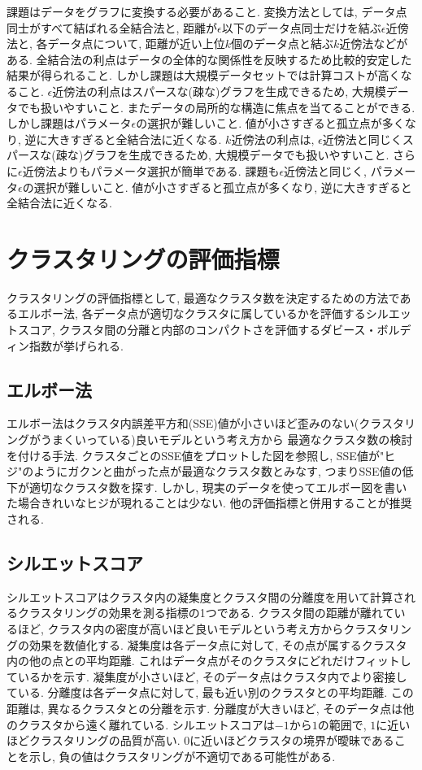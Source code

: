 \documentclass[dvipdfmx, 10pt]{jsarticle}
\begin{document}
課題はデータをグラフに変換する必要があること. 
変換方法としては, データ点同士がすべて結ばれる全結合法と, 距離が\(\epsilon\)以下のデータ点同士だけを結ぶ\(\epsilon\)近傍法と, 
各データ点について, 距離が近い上位\(k\)個のデータ点と結ぶ\(k\)近傍法などがある. 
全結合法の利点はデータの全体的な関係性を反映するため比較的安定した結果が得られること. 
しかし課題は大規模データセットでは計算コストが高くなること. 
\(\epsilon\)近傍法の利点はスパースな(疎な)グラフを生成できるため, 大規模データでも扱いやすいこと. 
またデータの局所的な構造に焦点を当てることができる. 
しかし課題はパラメータ\(\epsilon\)の選択が難しいこと. 値が小さすぎると孤立点が多くなり, 逆に大きすぎると全結合法に近くなる. 
\(k\)近傍法の利点は, \(\epsilon\)近傍法と同じくスパースな(疎な)グラフを生成できるため, 大規模データでも扱いやすいこと. 
さらに\(\epsilon\)近傍法よりもパラメータ選択が簡単である. 課題も\(\epsilon\)近傍法と同じく, 
パラメータ\(\epsilon\)の選択が難しいこと. 値が小さすぎると孤立点が多くなり, 逆に大きすぎると全結合法に近くなる. 

\section*{クラスタリングの評価指標}
クラスタリングの評価指標として, 最適なクラスタ数を決定するための方法であるエルボー法, 
各データ点が適切なクラスタに属しているかを評価するシルエットスコア, 
クラスタ間の分離と内部のコンパクトさを評価するダビース・ボルディン指数が挙げられる. 

\subsection*{エルボー法}
エルボー法はクラスタ内誤差平方和(SSE)値が小さいほど歪みのない(クラスタリングがうまくいっている)良いモデルという考え方から
最適なクラスタ数の検討を付ける手法. クラスタごとのSSE値をプロットした図を参照し, 
SSE値が"ヒジ"のようにガクンと曲がった点が最適なクラスタ数とみなす, つまりSSE値の低下が適切なクラスタ数を探す. 
しかし, 現実のデータを使ってエルボー図を書いた場合きれいなヒジが現れることは少ない. 他の評価指標と併用することが推奨される.

\subsection*{シルエットスコア}
シルエットスコアはクラスタ内の凝集度とクラスタ間の分離度を用いて計算されるクラスタリングの効果を測る指標の1つである. 
クラスタ間の距離が離れているほど, クラスタ内の密度が高いほど良いモデルという考え方からクラスタリングの効果を数値化する. 
凝集度は各データ点に対して, その点が属するクラスタ内の他の点との平均距離. 
これはデータ点がそのクラスタにどれだけフィットしているかを示す. 
凝集度が小さいほど, そのデータ点はクラスタ内でより密接している.
分離度は各データ点に対して, 最も近い別のクラスタとの平均距離. 
この距離は, 異なるクラスタとの分離を示す. 分離度が大きいほど, そのデータ点は他のクラスタから遠く離れている. 
シルエットスコアは\(-1\)から\(1\)の範囲で, \(1\)に近いほどクラスタリングの品質が高い. 
\(0\)に近いほどクラスタの境界が曖昧であることを示し, 負の値はクラスタリングが不適切である可能性がある. 
\end{document}
